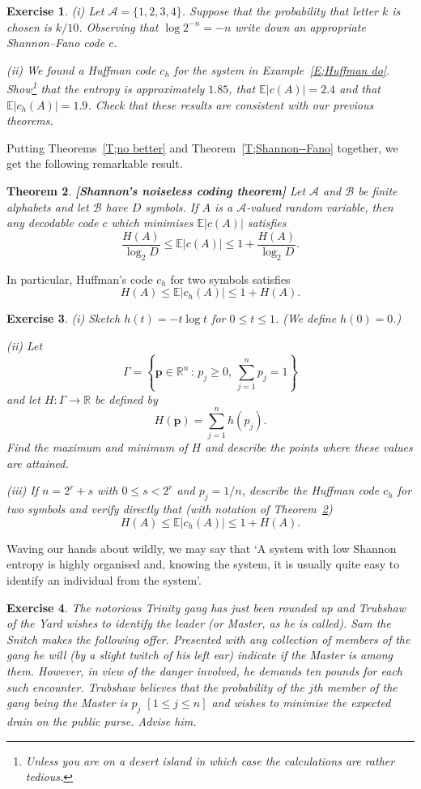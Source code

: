\documentclass[12pt,a4paper]{article}
\theoremstyle{plain}
\newtheorem{theorem}{Theorem}[section]
\newtheorem{exercise}[theorem]{Exercise}
\theoremstyle{definition}
\begin{document}
\begin{exercise}\label{E;Fano}
(i) Let ${\mathcal A}=\{1,2,3,4\}$. Suppose that the
probability
that letter $k$ is chosen is $k/10$.
Observing that $\log 2^{-n}=-n$
write down an appropriate Shannon--Fano code $c$.

(ii) We found a Huffman code $c_{h}$ for the system
in Example~\ref{E;Huffman do}. 
Show\footnote {Unless you are on a desert island
in which case the calculations are rather tedious.} 
that the entropy is approximately $1.85$,
that ${\mathbb E}|c(A)|=2.4$
and that  ${\mathbb E}|c_{h}(A)|=1.9$.
Check that these results are consistent with 
our previous theorems.
\end{exercise}
Putting Theorems~\ref{T;no better} and Theorem~\ref{T;Shannon--Fano}
together,
we get the following remarkable result.
\begin{theorem}\label{T;Shannon noiseless}%
{\bf[Shannon's noiseless coding theorem]} 
Let ${\mathcal A}$ and ${\mathcal B}$
be finite alphabets and let ${\mathcal B}$ have $D$ symbols. If 
$A$ is a ${\mathcal A}$-valued random variable, 
then any decodable code $c$ which minimises ${\mathbb E}|c(A)|$
satisfies
\[\frac{H(A)}{\log_{2} D}\leq
{\mathbb E}|c(A)|\leq 1+\frac{H(A)}{\log_{2} D}.\]
\end{theorem}
In particular,  Huffman's code $c_{h}$ for two symbols satisfies
 \[H(A)\leq
{\mathbb E}|c_{h}(A)|\leq 1+H(A).\]
\begin{exercise} (i) Sketch $h(t)=-t\log t$ for $0\leq t\leq 1$.
(We define $h(0)=0$.)

(ii) Let
\[\Gamma=\left\{{\mathbf p}\in{\mathbb R}^{n}
\,:\,p_{j}\geq 0,\ \sum_{j=1}^{n}p_{j}=1\right\}\]
and let $H:\Gamma\rightarrow{\mathbb R}$ be defined by
\[H({\mathbf p})=\sum_{j=1}^{n}h(p_{j}).\]
Find the maximum and minimum of $H$ and 
describe the points where these values are attained.

(iii) If $n=2^{r}+s$ with $0\leq s< 2^{r}$ and $p_{j}=1/n$,
describe the Huffman code $c_{h}$ for two symbols
and verify directly that (with notation
of Theorem~\ref{T;Shannon noiseless}) 
\[H(A)\leq
{\mathbb E}|c_{h}(A)|\leq 1+H(A).\]
\end{exercise}
Waving our hands about wildly, we may say that
`A system with low Shannon entropy is highly
organised and, knowing the system, it is
usually quite easy to identify an individual from the
system'.
\begin{exercise} The notorious Trinity gang 
has just been rounded up and
Trubshaw of the Yard wishes to identify the leader (or Master,
as he is called). Sam the Snitch makes the following offer.
Presented with any collection of members of the gang
he will (by a slight twitch of his left ear)
indicate if the Master is among them. However, in
view of the danger involved, he demands ten pounds
for each such encounter. Trubshaw believes that
the probability of the $j$th member of the gang being
the Master is $p_{j}$ $[1\leq j\leq n]$
and wishes to minimise the expected drain on the public purse.
Advise him.
\end{exercise}
\end{document}
